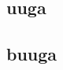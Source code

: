 \documentclass{article}
\begin{document}
\begin{center}\section*{uuga
}\end{center}\subsection*{buuga
}
\end{document}
